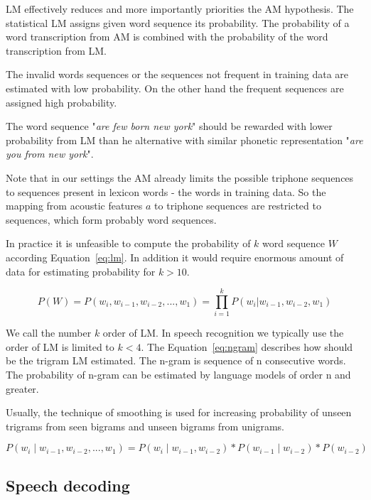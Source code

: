 {\ac{LM} effectively reduces and more importantly priorities the \ac{AM} hypothesis.
The statistical \ac{LM} assigns given word sequence its probability.
The probability of a word transcription from \ac{AM} is combined with
the probability of the word transcription from \ac{LM}.

The invalid words sequences or the sequences not frequent in training data
are estimated with low probability. On the other hand the frequent sequences
are assigned high probability.

The word sequence "{\it are few born new york}" should be rewarded 
with lower probability from \ac{LM} than he alternative with similar phonetic representation
"{\it are you from new york}".

Note that in our settings the \ac{AM} already limits the possible triphone
sequences to sequences present in lexicon words - the words in training data.
So the mapping from acoustic features $a$ to triphone sequences
are restricted to sequences, which form probably word sequences.

In practice it is unfeasible to compute the probability
of $k$ word sequence $W$ according Equation~\ref{eq:lm}.
In addition it would require enormous amount of data for estimating
probability for $k>10$.


\begin{equation} \label{eq:lm}
    P(W)=P(w_i,  w_{i-1}, w_{i-2}, ..., w_1)=\prod_{i=1}^{k}{P(w_i|w_{i-1}, w_{i-2}, w_1)}
\end{equation}

We call the number $k$ order of \ac{LM}.
In speech recognition we typically use the order of \ac{LM} is limited to $k<4$.
The Equation~\ref{eq:ngram} describes how should be the trigram \ac{LM} estimated.
The n-gram is sequence of n consecutive words. The probability of n-gram can be estimated by language models
of order n and greater.

Usually, the technique of smoothing \cite{TODO} is used for increasing probability of unseen trigrams
from seen bigrams and unseen bigrams from unigrams.

\begin{equation} \label{eq:ngram}
    P(w_i \mid w_{i-1}, w_{i-2}, ..., w_1) = P(w_i \mid w_{i-1}, w_{i-2}) * P(w_{i-1} \mid w_{i-2}) * P(w_{i-2})
\end{equation}

\subsection{Speech decoding}
\label{sub:decode}

}
